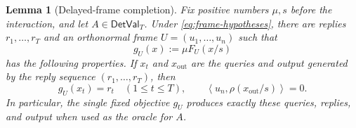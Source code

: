 \documentclass[11pt]{article}
\numberwithin{equation}{section}
\newtheorem{lemma}[lemma]{Lemma}
\theoremstyle{definition}
\theoremstyle{remark}
\newcommand{\ip}[2]{\left\langle #1,#2\right\rangle}
\newcommand{\DetVal}{\mathsf{DetVal}}
\begin{document}
\begin{lemma}[Delayed-frame completion]
\label{lem:completion}
Fix positive numbers $\mu,s$ before the interaction, and let
$A\in\DetVal_T$. Under \eqref{eq:frame-hypotheses}, there are replies
$r_1,\ldots,r_T$ and an orthonormal frame $U=(u_1,\ldots,u_n)$ such that
\begin{equation}
    g_U(x):=\mu F_U(x/s)
    \label{eq:gU}
\end{equation}
has the following properties. If $x_t$ and $x_{\mathrm{out}}$ are the
queries and output generated by the reply sequence $(r_1,\ldots,r_T)$,
then
\begin{equation}
    g_U(x_t)=r_t\quad(1\leq t\leq T),\qquad
    \ip{u_n}{\rho(x_{\mathrm{out}}/s)}=0.
    \label{eq:completion-properties}
\end{equation}
In particular, the single fixed objective $g_U$ produces exactly these
queries, replies, and output when used as the oracle for $A$.
\end{lemma}
\end{document}
